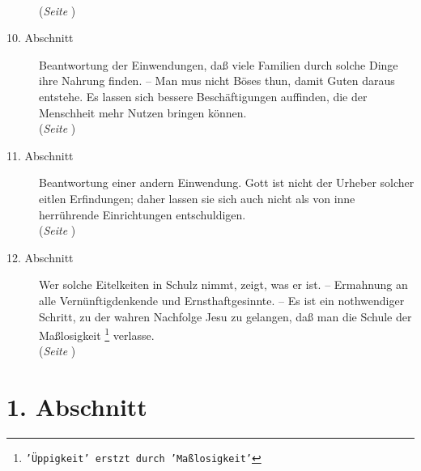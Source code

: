 \begin{description}
\\(\textit{Seite \pageref{kap17_ab9}})
\item[10. Abschnitt] Beantwortung der Einwendungen, daß viele Familien durch
solche Dinge ihre Nahrung finden. -- Man mus nicht Böses thun, damit Guten
daraus entstehe. Es lassen sich bessere Beschäftigungen auffinden, die der
Menschheit mehr Nutzen bringen können.
\\(\textit{Seite \pageref{kap17_ab10}})
\item[11. Abschnitt] Beantwortung einer andern Einwendung. Gott ist nicht der
Urheber solcher eitlen Erfindungen; daher lassen sie sich auch nicht als von
inne herrührende Einrichtungen entschuldigen.
\\(\textit{Seite \pageref{kap17_ab11}})
\item[12. Abschnitt] Wer solche Eitelkeiten in Schulz nimmt, zeigt, was er ist.
-- Ermahnung an alle Vernünftigdenkende und Ernsthaftgesinnte. -- Es ist ein
nothwendiger Schritt, zu der wahren Nachfolge Jesu zu gelangen, daß man die
Schule der Maßlosigkeit
\footnote{\texttt{'Üppigkeit' erstzt durch 'Maßlosigkeit'}}
verlasse.
\\(\textit{Seite \pageref{kap17_ab12}})

\end{description}

\newpage 

\section{1. Abschnitt} \label{kap17_ab1}

